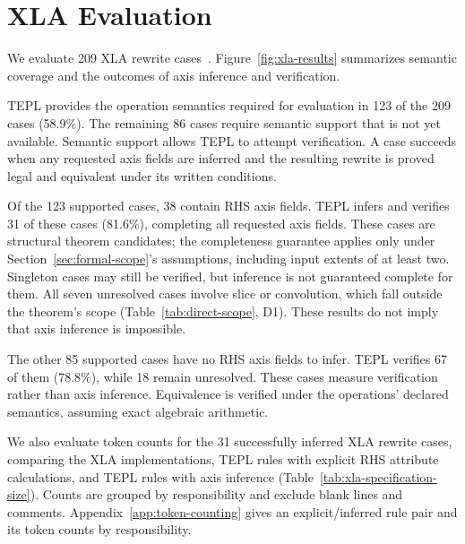 \section{XLA Evaluation}
\label{sec:evaluation}
We evaluate 209 XLA rewrite cases~\cite{xla-evaluation-source}. Figure~\ref{fig:xla-results} summarizes semantic coverage and the
outcomes of axis inference and verification.


TEPL provides the operation semantics required for evaluation in 123 of the
209 cases (58.9\%). The remaining 86 cases require semantic support that is
not yet available. Semantic support allows TEPL to attempt verification. A case succeeds when
any requested axis fields are inferred and the resulting rewrite is proved
legal and equivalent under its written conditions.

Of the 123 supported cases, 38 contain RHS axis fields. TEPL infers and
verifies 31 of these cases (81.6\%), completing all requested axis fields.
These cases are structural theorem candidates; the completeness guarantee
applies only under Section~\ref{sec:formal-scope}'s assumptions, including
input extents of at least two. Singleton cases may still be verified,
but inference is not guaranteed complete for them.
All seven unresolved cases involve slice or convolution, which fall outside
the theorem's scope (Table~\ref{tab:direct-scope}, D1). These results do not
imply that axis inference is impossible.

The other 85 supported cases have no RHS axis fields to infer. TEPL
verifies 67 of them (78.8\%), while 18 remain unresolved. These cases
measure verification rather than axis inference. Equivalence is verified
under the operations' declared semantics, assuming exact algebraic arithmetic.

We also evaluate token counts for the 31 successfully inferred XLA rewrite
cases, comparing the XLA implementations, TEPL rules with explicit RHS
attribute calculations, and TEPL rules with axis inference
(Table~\ref{tab:xla-specification-size}). Counts are grouped by responsibility
and exclude blank lines and comments.
Appendix~\ref{app:token-counting} gives an explicit/inferred rule pair and
its token counts by responsibility.

